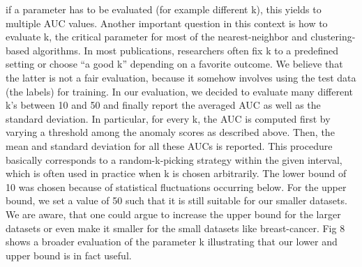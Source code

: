 {if a parameter has to be evaluated (for example different k), this yields to multiple AUC values.
Another important question in this context is how to evaluate k, the critical parameter for most
of the nearest-neighbor and clustering-based algorithms. In most publications, researchers
often fix k to a predefined setting or choose “a good k” depending on a favorite outcome. We
believe that the latter is not a fair evaluation, because it somehow involves using the test data
(the labels) for training. In our evaluation, we decided to evaluate many different k’s between
10 and 50 and finally report the averaged AUC as well as the standard deviation. In particular,
for every k, the AUC is computed first by varying a threshold among the anomaly scores as
described above. Then, the mean and standard deviation for all these AUCs is reported. This
procedure basically corresponds to a random-k-picking strategy within the given interval,
which is often used in practice when k is chosen arbitrarily. The lower bound of 10 was chosen
because of statistical fluctuations occurring below. For the upper bound, we set a value of 50
such that it is still suitable for our smaller datasets. We are aware, that one could argue to
increase the upper bound for the larger datasets or even make it smaller for the small datasets
like breast-cancer. Fig 8 shows a broader evaluation of the parameter k illustrating that our
lower and upper bound is in fact useful.}

